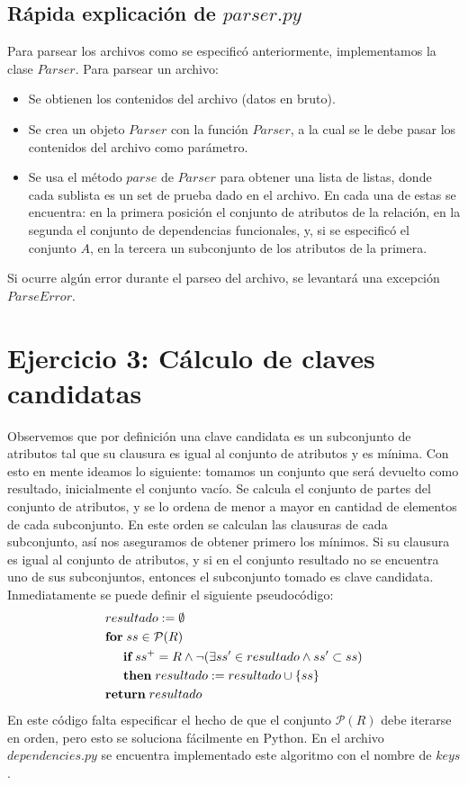 \documentclass[a4paper]{report}
\begin{document}
\subsection*{R\'apida explicaci\'on de $parser.py$}
Para parsear los archivos como se especific\'o anteriormente,
implementamos la clase $Parser$. Para parsear un archivo:
\begin{itemize}
\item Se obtienen los contenidos del archivo (datos en bruto).
\item Se crea un objeto $Parser$ con la funci\'on $Parser$, a la cual
    se le debe pasar los contenidos del archivo como par\'ametro.
\item Se usa el m\'etodo $parse$ de $Parser$ para obtener una lista de
    listas, donde cada sublista es un set de prueba dado en el archivo.
    En cada una de estas se encuentra: en la primera posici\'on el
    conjunto de atributos de la relaci\'on, en la segunda el conjunto de
    dependencias funcionales, y, si se especific\'o el conjunto $A$, en
    la tercera un subconjunto de los atributos de la primera.
\end{itemize}
Si ocurre alg\'un error durante el parseo del archivo, se levantar\'a
una excepci\'on $ParseError$.


\pagebreak


\section*{Ejercicio 3: C\'alculo de claves candidatas}
Observemos que por definici\'on una clave candidata es un subconjunto
de atributos tal que su clausura es igual al conjunto de atributos y es
m\'inima. Con esto en mente ideamos lo siguiente: tomamos un conjunto
que ser\'a devuelto como resultado, inicialmente el conjunto vac\'io.
Se calcula el conjunto de partes del conjunto de atributos, y se lo ordena
de menor a mayor en cantidad de elementos de cada subconjunto. En este
orden se calculan las clausuras de cada subconjunto, as\'i nos aseguramos
de obtener primero los m\'inimos. Si su clausura es igual al conjunto de
atributos, y si en el conjunto resultado no se encuentra uno de sus
subconjuntos, entonces el subconjunto tomado es clave candidata. \\
Inmediatamente se puede definir el siguiente pseudoc\'odigo:
\begin{align*}
    &resultado := \emptyset \\
    &\textbf{for}\; ss \in \mathcal{P}(R) \\
    &\hspace{.5cm} \textbf{if}\; ss^{+} = R \wedge \neg
                 (\exists ss' \in resultado \wedge ss' \subset ss) \\
    &\hspace{.5cm} \textbf{then}\; resultado := resultado \cup \{ss\} \\
    &\textbf{return}\; resultado
\end{align*}
En este c\'odigo falta especificar el hecho de que el conjunto
$\mathcal{P}(R)$ debe iterarse en orden, pero esto se soluciona
f\'acilmente en Python. En el archivo $dependencies.py$ se encuentra
implementado este algoritmo con el nombre de $keys$.
\end{document}
